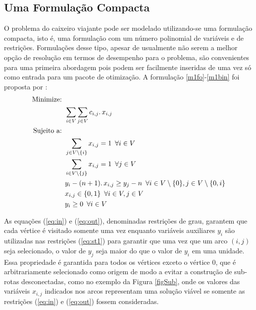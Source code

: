 \documentclass[a4paper,11pt,fleqn]{article}
\begin{document}
\subsection{Uma Formulação Compacta}

O problema do caixeiro viajante pode ser modelado utilizando-se uma formulação compacta, isto é, uma formulação com um número polinomial de variáveis e de restrições. 
Formulações desse tipo, apesar de usualmente não serem a melhor opção de resolução em termos de desempenho para o problema, são convenientes para uma primeira abordagem pois podem ser facilmente inseridas de uma vez só como entrada para um pacote de otimização. 
A formulação \eqref{m1fo}-\eqref{m1bin} foi proposta por \cite{Miller1960}:
\allowdisplaybreaks
\begin{align}
    \label{m1fo} \textrm{Minimize: }   & \nonumber \\
    &  \sum_{i \in V} \sum_{j \in V} c_{i,j} \ldotp x_{i,j} \\
    \textrm{Sujeito a: }   & \nonumber \\
    & \sum_{j \in V \setminus \{i\}} x_{i,j} = 1 \,\,\, \forall i \in V \label{eq:in}  \\
    & \sum_{i \in V \setminus \{j\}} x_{i,j} = 1 \,\,\, \forall j \in V \label{eq:out} \\
    & y_{i} -(n+1)\ldotp x_{i,j} \geq y_{j} -n  \,\,\, \forall i \in V\setminus \{0\}, j \in V\setminus \{0,i\} \label{eq:st1} \\
    & x_{i,j} \in \{0,1\} \,\,\, \forall i \in V, j \in V \\
    \label{m1bin} & y_i \geq 0 \,\,\, \forall i \in V 
\end{align}

As equações (\ref{eq:in}) e (\ref{eq:out}), denominadas restrições de grau, garantem que cada vértice é visitado somente uma vez enquanto variáveis auxiliares $y_{i}$ são utilizadas nas restrições (\ref{eq:st1}) para garantir que uma vez que um arco $(i,j)$ seja selecionado, o valor de $y_{j}$ seja maior do que o valor de $y_{i}$ em uma unidade. 
Essa propriedade é garantida para todos os vértices exceto o vértice 0, que é arbitrariamente selecionado como origem de modo a evitar a construção de sub-rotas desconectadas, como no exemplo da Figura \ref{figSub}, onde os valores das variáveis $x_{i,j}$ indicados nos arcos representam uma solução viável se somente as restrições (\ref{eq:in}) e (\ref{eq:out}) fossem consideradas.
\end{document}
